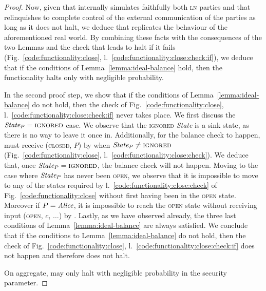 \begin{proof}
  Now, given that \simulator internally simulates faithfully both \textsc{ln}
  parties and that \fchan relinquishes to \simulator complete control of the
  external communication of the parties as long as it does not halt, we deduce
  that \simulator replicates the behaviour of the aforementioned real world. By
  combining these facts with the consequences of the two Lemmas and the check
  that leads \fchan to halt if it fails (Fig.~\ref{code:functionality:close},
  l.~\ref{code:functionality:close:check:if}), we deduce that if the conditions
  of Lemma~\ref{lemma:ideal-balance} hold, then the functionality halts only
  with negligible probability.

  In the second proof step, we show that if the conditions of
  Lemma~\ref{lemma:ideal-balance} do not hold, then the check of
  Fig.~\ref{code:functionality:close},
  l.~\ref{code:functionality:close:check:if} never takes place. We first discuss
  the $\itistate_P = \textsc{ignored}$ case. We observe that the
  \textsc{ignored} \textit{State} is a sink state, as there is no way to leave
  it once in. Additionally, for the balance check to happen, \fchan must receive
  (\textsc{closed}, $P$) by \simulator when $\itistate_P \neq \textsc{ignored}$
  (Fig.~\ref{code:functionality:close},
  l.~\ref{code:functionality:close:check}). We deduce that, once $\itistate_P =
  \textsc{ignored}$, the balance check will not happen. Moving to the case where
  $\itistate_P$ has never been \textsc{open}, we observe that it is impossible
  to move to any of the states required by
  l.~\ref{code:functionality:close:check} of Fig.~\ref{code:functionality:close}
  without first having been in the \textsc{open} state. Moreover if $P =
  \mathit{Alice}$, it is impossible to reach the \textsc{open} state without receiving
  input (\textsc{open}, $c$, $\dots$) by \environment. Lastly, as we have
  observed already, the three last conditions of Lemma~\ref{lemma:ideal-balance}
  are always satisfied. We conclude that if the conditions to
  Lemma~\ref{lemma:ideal-balance} do not hold, then the check of
  Fig.~\ref{code:functionality:close},
  l.~\ref{code:functionality:close:check:if} does not happen and therefore
  \fchan does not halt.

  On aggregate, \fchan may only halt with negligible probability in the security
  parameter.
\end{proof}
